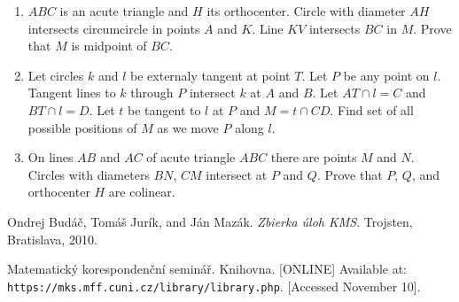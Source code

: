 \documentclass[11pt,a5paper]{article}
\begin{document}
\begin{enumerate}
	\item{$ABC$ is an acute triangle and $H$ its orthocenter. Circle with diameter $AH$ intersects circumcircle in points $A$ and $K$. Line $KV$ intersects $BC$ in $M$. Prove that $M$ is midpoint of $BC$.}
	
	\item{Let circles $k$ and $l$ be externaly tangent at point $T$. Let $P$ be any point on $l$. Tangent lines to $k$ through $P$ intersect $k$ at $A$ and $B$. Let $AT \cap l = C$ and $BT \cap l = D$. Let $t$ be tangent to $l$ at $P$ and $M = t \cap CD$. Find set of all possible positions of $M$ as we move $P$ along $l$.}
	
	\item{On lines $AB$ and $AC$ of acute triangle $ABC$ there are points $M$ and $N$. Circles with diameters $BN$, $CM$ intersect at $P$ and $Q$. Prove that $P$, $Q$, and orthocenter $H$ are colinear.}

\end{enumerate}

\begin{thebibliography}{9}
 Ondrej Budáč, Tomáš Jurík, and Ján Mazák. 
	\emph{Zbierka úloh KMS}. Trojsten, Bratislava, 2010.
	
 Matematický korespondenční seminář. Knihovna. [ONLINE] Available at: \texttt{https://mks.mff.cuni.cz/library/library.php}. [Accessed November 10].
\end{thebibliography}
\end{document}
